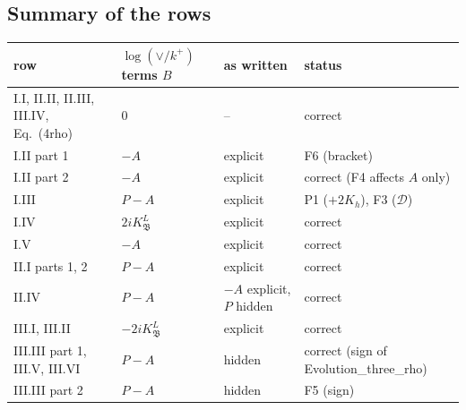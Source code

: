 \subsection{Summary of the rows}
\begin{center}\small
\begin{tabular}{@{}l l l l@{}}
row & $\log(\vee/k^+)$ terms $B$ & as written & status\\ \hline
I.I, II.II, II.III, III.IV, Eq.~(4rho) & 0 & -- & correct\\
I.II part 1 & $-A$ & explicit & F6 (bracket)\\
I.II part 2 & $-A$ & explicit & correct (F4 affects $A$ only)\\
I.III & $P-A$ & explicit & P1 ($+2K_h$), F3 ($\mathcal D$)\\
I.IV & $2iK^L_{\mathfrak B}$ & explicit & correct\\
I.V & $-A$ & explicit & correct\\
II.I parts 1, 2 & $P-A$ & explicit & correct\\
II.IV & $P-A$ & $-A$ explicit, $P$ hidden & correct\\
III.I, III.II & $-2iK^L_{\mathfrak B}$ & explicit & correct\\
III.III part 1, III.V, III.VI & $P-A$ & hidden & correct (sign of Evolution\_three\_rho)\\
III.III part 2 & $P-A$ & hidden & F5 (sign)\\
\end{tabular}
\end{center}
